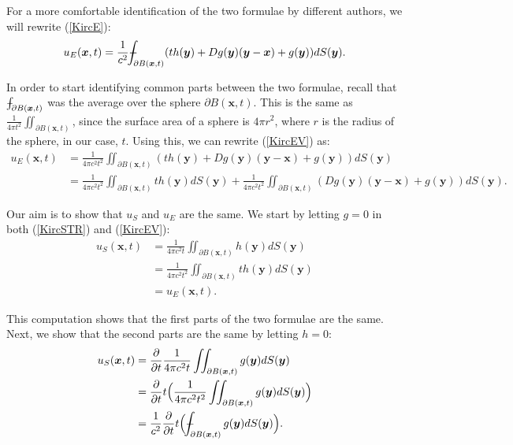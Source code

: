 \documentclass[a4paper, 12pt]{article}
\def\Xint#1{\mathchoice
{\XXint\displaystyle\textstyle{#1}}%
{\XXint\textstyle\scriptstyle{#1}}%
{\XXint\scriptstyle\scriptscriptstyle{#1}}%
{\XXint\scriptscriptstyle\scriptscriptstyle{#1}}%
\!\int}
\def\XXint#1#2#3{{\setbox0=\hbox{$#1{#2#3}{\int}$ }
\vcenter{\hbox{$#2#3$ }}\kern-.6\wd0}}
\def\dashint{\Xint-}
\numberwithin{equation}{section}
\begin{document}
For a more comfortable identification of the two formulae by different authors,
we will rewrite (\ref{KircE}): 
\begin{equation} \label{KircEV}
    u_E(\boldsymbol{x},t)=\frac{1}{c^2}\dashint_{\partial B(\boldsymbol{x},t)}(th(\boldsymbol{y})+Dg(\boldsymbol{y})(\boldsymbol{y}-\boldsymbol{x})+g(\boldsymbol{y}))dS(\boldsymbol{y}).
\end{equation}

In order to start identifying common parts between the two formulae, recall that
$\dashint_{\partial B(\boldsymbol{x}, t)}$ was the average over the sphere
$\partial B(\boldsymbol{x}, t)$. This is the same as $\frac{1}{4 \pi
t^2}\iint_{\partial B(\boldsymbol{x}, t)}$, since the surface area of a sphere
is $4\pi r^2$, where $r$ is the radius of the sphere, in our case, $t$. Using
this, we can rewrite (\ref{KircEV}) as:
\begin{equation*}
    \begin{aligned}
    u_E(\boldsymbol{x},t)&=\frac{1}{4 \pi c^2 t^2}\iint_{\partial B(\boldsymbol{x},t)} (th(\boldsymbol{y})+Dg(\boldsymbol{y})(\boldsymbol{y}-\boldsymbol{x})+g(\boldsymbol{y}))dS(\boldsymbol{y})\\ 
    &=\frac{1}{4 \pi c^2 t^2}\iint_{\partial B(\boldsymbol{x},t)} th(\boldsymbol{y})dS(\boldsymbol{y})+\frac{1}{4 \pi c^2 t^2}\iint_{\partial B(\boldsymbol{x},t)}(Dg(\boldsymbol{y})(\boldsymbol{y}-\boldsymbol{x})+g(\boldsymbol{y}))dS(\boldsymbol{y}).
    \end{aligned}
\end{equation*}

Our aim is to show that $u_S$ and $u_E$ are the same. We start by letting $g=0$
in both (\ref{KircSTR}) and (\ref{KircEV}):
\begin{equation} \label{g=0}
    \begin{aligned}
        u_S(\boldsymbol{x}, t)&=\frac{1}{4\pi c^2 t}\iint_{\partial B(\boldsymbol{x}, t)}h(\boldsymbol{y})dS(\boldsymbol{y})\\
        &=\frac{1}{4\pi c^2 t^2}\iint_{\partial B(\boldsymbol{x}, t)}th(\boldsymbol{y})dS(\boldsymbol{y})\\
        &=u_E(\boldsymbol{x}, t).
    \end{aligned}
\end{equation}

This computation shows that the first parts of the two formulae are the same.
Next, we show that the second parts are the same by letting $h=0$:
\begin{equation} \label{starr}
    \begin{aligned}
        u_S(\boldsymbol{x},t)&=\diffp[1]{}{t}\frac{1}{4\pi c^2 t}\iint_{\partial B(\boldsymbol{x}, t)}g(\boldsymbol{y})dS(\boldsymbol{y})\\
        &=\diffp[1]{}{t}t\Big(\frac{1}{4\pi c^2 t^2}\iint_{\partial B(\boldsymbol{x}, t)}g(\boldsymbol{y})dS(\boldsymbol{y})\Big)\\
        &=\frac{1}{c^2}\diffp[1]{}{t}t\Big(\dashint_{\partial B(\boldsymbol{x}, t)}g(\boldsymbol{y})dS(\boldsymbol{y})\Big).
    \end{aligned}
\end{equation}
\end{document}
